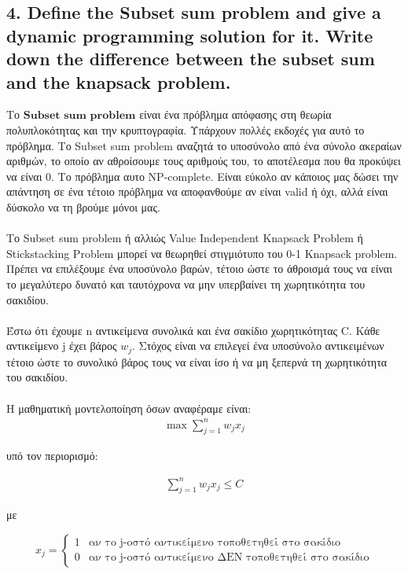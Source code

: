 \documentclass[12pt]{article}
\begin{document}
\pagebreak

\subsection*{4. Define the Subset sum problem and give a dynamic programming solution for
	it. Write down the difference between the subset sum and the knapsack problem.}

Το \(\textbf{Subset sum problem}\) είναι ένα πρόβλημα απόφασης στη θεωρία πολυπλοκότητας και την κρυπτογραφία. Υπάρχουν πολλές εκδοχές για αυτό το πρόβλημα. Το Subset sum problem αναζητά το υποσύνολο από ένα σύνολο ακεραίων αριθμών, το οποίο αν αθροίσουμε τους αριθμούς του, το αποτέλεσμα που θα προκύψει να είναι 0. Το πρόβλημα αυτο NP-complete. Είναι εύκολο αν κάποιος μας δώσει την απάντηση σε ένα τέτοιο πρόβλημα να αποφανθούμε αν είναι valid ή όχι, αλλά είναι δύσκολο να τη βρούμε μόνοι μας. \\ \\

Το Subset sum problem ή αλλιώς Value Independent Knapsack Problem ή Stickstacking Problem μπορεί να θεωρηθεί στιγμιότυπο του 0-1 Knapsack problem. Πρέπει να επιλέξουμε ένα υποσύνολο βαρών, τέτοιο ώστε το άθροισμά τους να είναι το μεγαλύτερο δυνατό και ταυτόχρονα να μην υπερβαίνει τη χωρητικότητα του σακιδίου. \\ \\

Έστω ότι έχουμε n αντικείμενα συνολικά και ένα σακίδιο χωρητικότητας C. Κάθε αντικείμενο j έχει βάρος \(w_{j}\). Στόχος είναι να επιλεγεί ένα υποσύνολο αντικειμένων τέτοιο ώστε το συνολικό βάρος τους να είναι ίσο ή να μη ξεπερνά τη χωρητικότητα του σακιδίου. \\ \\

Η μαθηματική μοντελοποίηση όσων αναφέραμε είναι: \\

\begin{align*}
	\max \sum_{j=1}^{n}{w_{j}x_{j}}
\end{align*}

υπό τον περιορισμό:

\begin{align*}
	\sum_{j=1}^{n}{w_{j}x_{j}} \leq C
\end{align*}

με

 \[ x_{j} =
\begin{cases}
1 & \text{αν το j-οστό αντικείμενο τοποθετηθεί στο σακίδιο} \\
0 & \text{αν το j-οστό αντικείμενο ΔΕΝ τοποθετηθεί στο σακίδιο}
\end{cases}
\]
\end{document}
